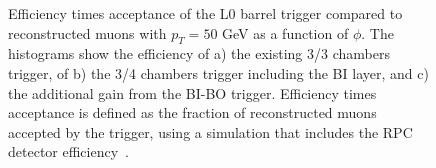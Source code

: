 \begin{figure}[h]
	\centering
\end{figure}	

\begin{figure}[h]
	\centering	
	\caption{Efficiency times acceptance of the L0 barrel trigger compared to reconstructed muons with $p_{T} = 50$ GeV as a function of $\phi$. The histograms show the efficiency of a) the existing 3/3 chambers trigger, of b) the 3/4 chambers trigger including the BI layer, and c) the additional gain from the BI-BO trigger. Efficiency times acceptance is defined as the fraction of reconstructed muons accepted by the trigger, using a simulation that includes the RPC detector efficiency~\cite{Marcoccia:2693982}.}

\end{figure}	
\FloatBarrier

